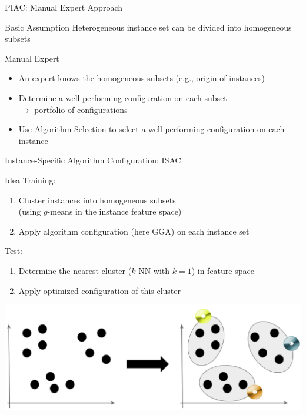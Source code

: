 \begin{frame}[c]{PIAC: Manual Expert Approach}

\begin{block}{Basic Assumption}
Heterogeneous instance set can be divided into homogeneous subsets
\end{block}

\pause
\bigskip

\begin{block}{Manual Expert}
\begin{itemize}
\item An expert knows the homogeneous subsets (e.g., origin of instances)
\item Determine a well-performing configuration on each subset\\
$\to$ portfolio of configurations
\item Use Algorithm Selection to select a well-performing configuration on each instance 
\end{itemize}

\end{block}  

\end{frame}
\begin{frame}{Instance-Specific Algorithm Configuration: ISAC{} }


\begin{block}{Idea}
Training:
\begin{enumerate}
\item Cluster instances into homogeneous subsets\\ (using $g$-means in the instance feature space)
\item Apply algorithm configuration (here GGA) on each instance set
\end{enumerate}

\pause
Test:
\begin{enumerate}
\item Determine the nearest cluster ($k$-NN with $k=1$) in feature space
\item Apply optimized configuration of this cluster 
\end{enumerate}
\end{block}

\begin{center}
\includegraphics[width=.3\textwidth]{images/isac}
\end{center}

\end{frame}
